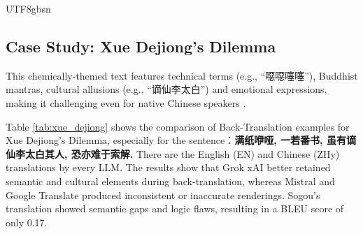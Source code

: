 \documentclass[conference]{IEEEtran}
\begin{document}
\begin{CJK}{UTF8}{gbsn}
\subsection{Case Study: Xue Dejiong’s Dilemma} 
This chemically-themed text features technical terms (e.g., ``噁噁噻噻''), Buddhist mantras, cultural allusions (e.g., ``谪仙李太白'') and emotional expressions, making it challenging even for native Chinese speakers \citep{hejuan2019nomencl}. 

Table \ref{tab:xue_dejiong} shows the comparison of Back-Translation examples for Xue Dejiong's Dilemma, especially for the sentence：\textbf{满纸咿哑,  一若番书,  虽有谪仙李太白其人, 恐亦难于索解.} There are the English (EN) and Chinese (ZHy) translations by every LLM. The results show that Grok xAI better retained semantic and cultural elements during back-translation, whereas Mistral and Google Translate produced inconsistent or inaccurate renderings. Sogou’s translation showed semantic gaps and logic flaws, resulting in a BLEU score of only 0.17. 


\end{CJK}
\end{document}
